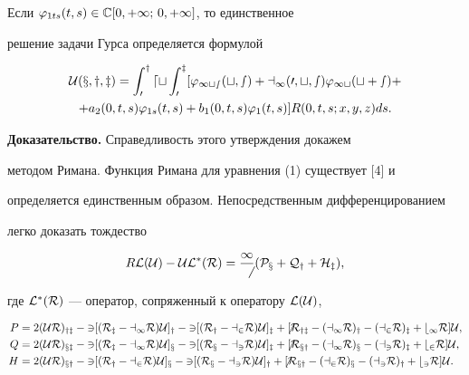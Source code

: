  


\begin{thmnonum} 


Если $\varphi_{1ts}(t,s)\in\Bbb C[0,+\infty;\,0,+\infty]$, то единственное 


решение задачи Гурса определяется формулой 


\begin{multline} 


\U(x,y,z)=\int^y_0 dt\int^z_0[\varphi_{1ts}(t,s)+ 


a_1(0,t,s)\varphi_{1t}(t+s)+ \\ 


% 


+a_2(0,t,s)\varphi_{1s}(t,s)+b_1(0,t,s)\varphi_1(t,s)] 


R(0,t,s;x,y,z)ds. 


\end{multline} 


\end{thmnonum} 


 


{\bf Доказательство.} Справедливость этого утверждения докажем 


методом Римана. Функция Римана для уравнения (1) существует [4] и 


определяется единственным образом. Непосредственным дифференцированием 


легко доказать тождество 


$$ 


R\cal L(\U)-\U\cal L^*(R)=\frac{1}{6}(P_x+Q_y+H_z), 


$$ 


где $\cal L^*(R)$ --- оператор, сопряженный к оператору $\cal L(\cal U)$, 


\begin{align*} 


P&=2(\U R)_{yz}-3[(R_z-a_1R)\U]_y-3[(R_y-a_2R)\U]_z+


6[R_{yz}-(a_1R)_y-(a_2R)_z+b_1R]\U,\\ 


% 


Q&=2(\U R)_{xz}-3[(R_z-a_1R)\U]_x-3[(R_x-a_3R)\U]_z+ 


6[R_{xy}-(a_1R)_x-(a_3R)_z+b_2R]\U,\\ 


% 


H&=2(\U R)_{xy}-3[(R_y-a_2R)\U]_x-3[(R_x-a_3R)\U]_y+ 


6[R_{xy}-(a_2R)_x-(a_3R)_y+b_3R]\U.\end{align*} 


